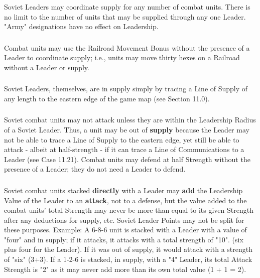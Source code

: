 \subsubsection{} Soviet Leaders may coordinate supply for any number of combat units. There is no limit to the number of units that may be supplied through any one Leader. "Army" designations have no effect on Leadership.

\subsubsection{} Combat units may use the Railroad Movement Bonus without the presence of a Leader to coordinate supply; i.e., units may move thirty hexes on a Railroad without a Leader or supply.

\subsubsection{} Soviet Leaders, themselves, are in supply simply by tracing a Line of Supply of any length to the eastern edge of the game map (see Section 11.0).

\subsubsection{} Soviet combat units may not attack unless they are within the Leadership Radius of a Soviet Leader. Thus, a unit may be out of \textbf{supply} because the Leader may not be able to trace a Line of Supply to the eastern edge, yet still be able to attack - albeit at half-strength - if it can trace a Line of Communications to a Leader (see Case 11.21). Combat units may defend at half Strength without the presence of a Leader; they do not need a Leader to defend.

\subsubsection{} Soviet combat units stacked \textbf{directly} with a Leader may \textbf{add} the Leadership Value of the Leader to an \textbf{attack}, not to a defense, but the value added to the combat units' total Strength may never be more than equal to its given Strength after any deductions for supply, etc. Soviet Leader Points may not be split for these purposes. Example: A 6-8-6 unit is stacked with a Leader with a value of "four" and in supply; if it attacks, it attacks with a total strength of "10". (six plus four for the Leader). If it was out of supply, it would attack with a strength of "six" (3+3). If a 1-2-6 is stacked, in supply, with a "4" Leader, its total Attack Strength is "2" as it may never add more than its own total value (1 + 1 = 2).

